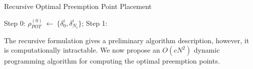 \begin{algorithm}
\caption*{Recursive Optimal Preemption Point Placement}
\label{alg:recursive-optimal-ppp}
\begin{algorithmic}[1]
\State Step 0:
\State\hspace{\algorithmicindent} {$\rho_{POT}^{(0)}\ \gets\ \{\delta_{0}^{i},\delta_{N_{i}}^{i}\}$};
\hspace{\algorithmicindent}
\State{}
\EndIf
\State Step 1:
\end{algorithmic}
\end{algorithm}

\noindent
The recursive formulation gives a preliminary algorithm description, however, it is computationally intractable.  We now propose an \begin{math}O(cN^{2})\end{math} dynamic programming algorithm for computing the optimal preemption points.

